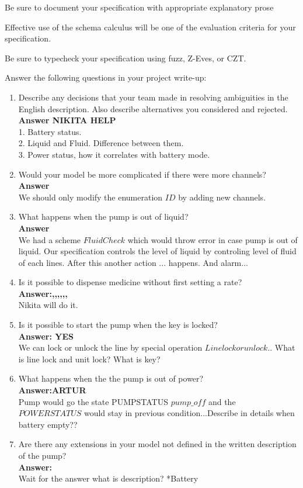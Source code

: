 \documentclass{article}
\begin{document}
\bigskip Be sure to document your specification with appropriate explanatory prose

\bigskip Effective use of the schema calculus will be one of the evaluation criteria for your specification.

\bigskip Be sure to typecheck your specification using fuzz,
Z-Eves, or CZT.

\bigskip Answer the following questions in your project write-up:
\begin{enumerate}
    \item Describe any decisions that your team made in resolving
    ambiguities in the English description. Also describe
    alternatives you considered and rejected.
    \\
    \textbf{Answer NIKITA HELP}\\
    1. Battery status.\\
    2. Liquid and Fluid. Difference between them.\\
    3. Power status, how it correlates with battery mode.\\
 
    \item Would your model be more complicated if there were more
    channels?
    \\
    \textbf{Answer}\\
    We should only modify the enumeration $ID$ by adding new channels.
    \item What happens when the pump is out of liquid?
    \\
    \textbf{Answer}\\
    We had a scheme $FluidCheck$ which would throw error in case pump is out of liquid. Our specification controls the level of liquid by controling level of fluid of each lines. After this another action ... happens. And alarm...
    \item Is it possible to dispense medicine without first
    setting a rate?
    \\
    \textbf{Answer:,,,,,,}\\
    Nikita will do it.
    \item Is it possible to start the pump when the key is locked?
    \\
    \textbf{Answer: YES}\\
    We can lock or unlock the line by special operation $Linelockorunlock$.. What is line lock and unit lock? What is key? 
    \item What happens when the the pump is out of power?
    \\
    \textbf{Answer:ARTUR}\\
    Pump would go the state PUMPSTATUS $pump\_off$ and the $POWERSTATUS$ would stay in previous condition...Describe in details when battery empty?? 
    \item Are there any extensions in your model not defined in
    the written description of the pump?
    \\
    \textbf{Answer:}\\
    Wait for the answer what is description? *Battery
\end{enumerate}
\end{document}
